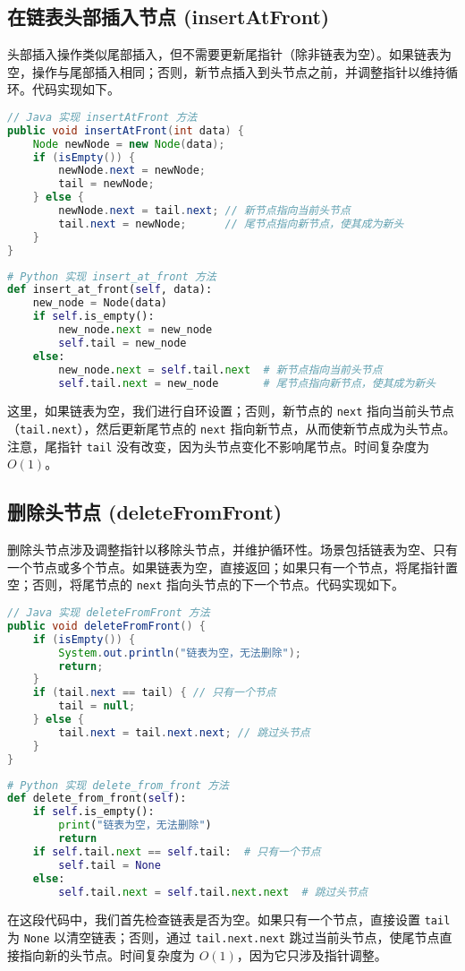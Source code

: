 \subsection{在链表头部插入节点 (insertAtFront)}
头部插入操作类似尾部插入，但不需要更新尾指针（除非链表为空）。如果链表为空，操作与尾部插入相同；否则，新节点插入到头节点之前，并调整指针以维持循环。代码实现如下。\par
\begin{lstlisting}[language=java]
// Java 实现 insertAtFront 方法
public void insertAtFront(int data) {
    Node newNode = new Node(data);
    if (isEmpty()) {
        newNode.next = newNode;
        tail = newNode;
    } else {
        newNode.next = tail.next; // 新节点指向当前头节点
        tail.next = newNode;      // 尾节点指向新节点，使其成为新头
    }
}
\end{lstlisting}
\begin{lstlisting}[language=python]
# Python 实现 insert_at_front 方法
def insert_at_front(self, data):
    new_node = Node(data)
    if self.is_empty():
        new_node.next = new_node
        self.tail = new_node
    else:
        new_node.next = self.tail.next  # 新节点指向当前头节点
        self.tail.next = new_node       # 尾节点指向新节点，使其成为新头
\end{lstlisting}
这里，如果链表为空，我们进行自环设置；否则，新节点的 \texttt{next} 指向当前头节点（\texttt{tail.next}），然后更新尾节点的 \texttt{next} 指向新节点，从而使新节点成为头节点。注意，尾指针 \texttt{tail} 没有改变，因为头节点变化不影响尾节点。时间复杂度为 $O(1)$。\par
\subsection{删除头节点 (deleteFromFront)}
删除头节点涉及调整指针以移除头节点，并维护循环性。场景包括链表为空、只有一个节点或多个节点。如果链表为空，直接返回；如果只有一个节点，将尾指针置空；否则，将尾节点的 \texttt{next} 指向头节点的下一个节点。代码实现如下。\par
\begin{lstlisting}[language=java]
// Java 实现 deleteFromFront 方法
public void deleteFromFront() {
    if (isEmpty()) {
        System.out.println("链表为空，无法删除");
        return;
    }
    if (tail.next == tail) { // 只有一个节点
        tail = null;
    } else {
        tail.next = tail.next.next; // 跳过头节点
    }
}
\end{lstlisting}
\begin{lstlisting}[language=python]
# Python 实现 delete_from_front 方法
def delete_from_front(self):
    if self.is_empty():
        print("链表为空，无法删除")
        return
    if self.tail.next == self.tail:  # 只有一个节点
        self.tail = None
    else:
        self.tail.next = self.tail.next.next  # 跳过头节点
\end{lstlisting}
在这段代码中，我们首先检查链表是否为空。如果只有一个节点，直接设置 \texttt{tail} 为 \texttt{None} 以清空链表；否则，通过 \texttt{tail.next.next} 跳过当前头节点，使尾节点直接指向新的头节点。时间复杂度为 $O(1)$，因为它只涉及指针调整。\par
